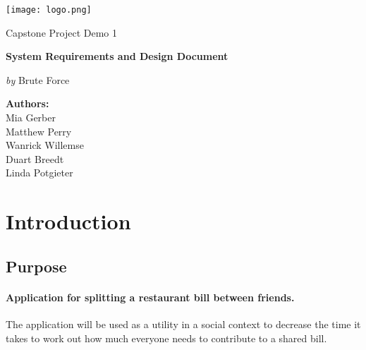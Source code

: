 \documentclass[12pt,a4paper]{article}
\begin{document}
   \begin{titlepage}
      {\selectfont
      	\centering
      	\texttt{[image: logo.png]}\par\vspace{1cm}
      	{\LARGE Capstone Project Demo 1 \par}
      	\vspace{0.25cm}
      	{\huge\bfseries \color{cyan}System Requirements and Design Document\par}
      	\vspace{1cm}
      	{\Large\textit{by} Brute Force\par}
         \vspace{0.25cm}

         \par\vspace{1cm}
         \date{}
         \author{}
         \title{}
         \centering
         \textbf{Authors:}\\
         Mia Gerber\\
         Matthew Perry\\
         Wanrick Willemse\\
         Duart Breedt\\
         Linda Potgieter\\
      }
   \end{titlepage}
   \maketitle
   \tableofcontents
   \newpage

   \section{Introduction}
   	\subsection{Purpose}
		\paragraph{Application for splitting a restaurant bill between friends.}
		The application will be used as a utility in a social context to decrease the time it takes to work out how much everyone needs to contribute to a shared bill. 
		
\end{document}

